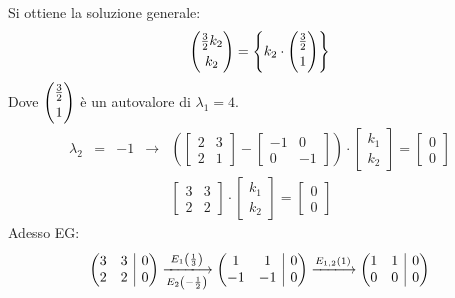 \documentclass[a4paper]{article}
\makeatletter
\newenvironment{rowequmat}[1]{\left(\array{@{}#1@{}}}{\endarray\right)}
\makeatother
\begin{document}
	Si ottiene la soluzione generale:
	\begin{equation*}
		\begin{rowequmat}{c}
			\frac{3}{2}k_{2} \\ [.3em]
			k_{2}
		\end{rowequmat} = \left\{
			k_{2} \cdot \begin{rowequmat}{c}
				\frac{3}{2} \\ [.3em]
				1
			\end{rowequmat}
		\right\}
	\end{equation*}
	Dove $\begin{rowequmat}{c}
		\frac{3}{2} \\ [.3em]
		1
	\end{rowequmat}$ è un autovalore di $\lambda_{1}=4$.
	\begin{equation*}
		\begin{array}{rclcl}
			\lambda_{2} &=& -1 &\longrightarrow& \left(
				\begin{bmatrix}
					2 & 3 \\ 2 & 1
				\end{bmatrix}
				-
				\begin{bmatrix}
					-1 & 0 \\ 0 & -1
				\end{bmatrix}
			\right)
			\cdot
			\begin{bmatrix}
				k_{1} \\ k_{2}
			\end{bmatrix}
			=
			\begin{bmatrix}
				0 \\ 0
			\end{bmatrix} \\ [1.5em]
			&&&& \begin{bmatrix}
				3 & 3 \\ 2 & 2
			\end{bmatrix}
			\cdot 
			\begin{bmatrix}
				k_{1} \\ k_{2}
			\end{bmatrix}
			=
			\begin{bmatrix}
				0 \\ 0
			\end{bmatrix}
		\end{array}
	\end{equation*}
	Adesso EG:
	\begin{equation*}
		\begin{rowequmat}{ c c | c }
			3 & 3 & 0 \\ 2 & 2 & 0
		\end{rowequmat}
		\xlongrightarrow[E_{2}\left(-\frac{1}{2}\right)]{E_{1}\left(\frac{1}{3}\right)}
		\begin{rowequmat}{ c c | c }
			1 & 1 & 0 \\ -1 & -1 & 0
		\end{rowequmat}
		\xlongrightarrow{E_{1,2}\left(1\right)}
		\begin{rowequmat}{ c c | c }
			1 & 1 & 0 \\ 0 & 0 & 0
		\end{rowequmat}
	\end{equation*}
\end{document}
